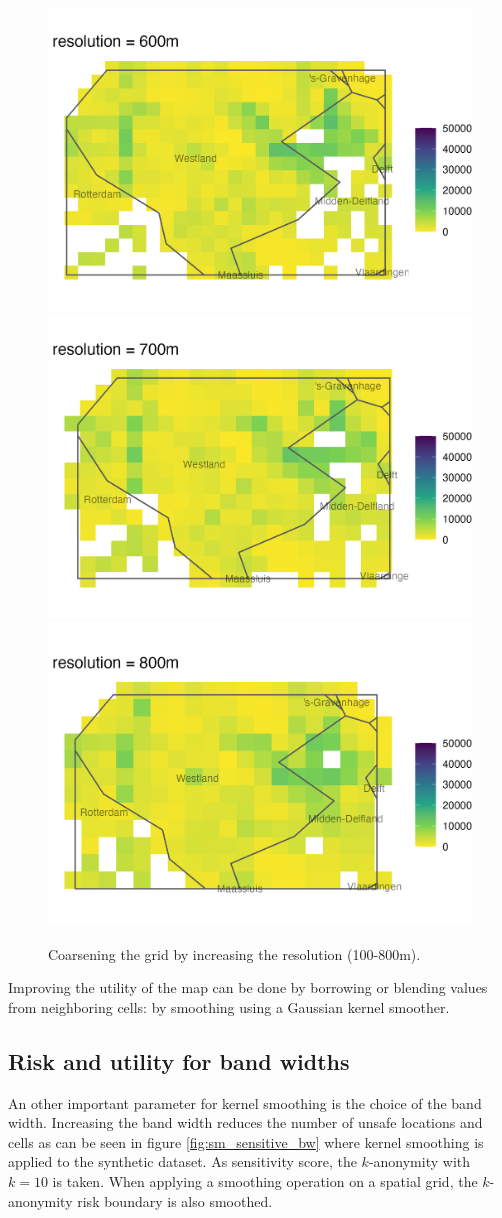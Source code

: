 \begin{figure}[H]
    \includegraphics[width=.49\linewidth]{figures/Smoothing/res_600.png}\\
    \includegraphics[width=.49\linewidth]{figures/Smoothing/res_700.png}
    \includegraphics[width=.49\linewidth]{figures/Smoothing/res_800.png}\\
    \caption{Coarsening the grid by increasing the resolution (100-800m).}
    \label{fig:sm_resolution}
\end{figure}

Improving the utility of the map can be done by borrowing or blending values from 
neighboring cells: by smoothing using a Gaussian kernel smoother. 

\subsection{Risk and utility for band widths}

An other important parameter for kernel smoothing is the choice of the band width.
Increasing the band width reduces the number of unsafe locations and cells as
can be seen in figure \ref{fig:sm_sensitive_bw} where kernel smoothing is 
applied to the synthetic dataset. As sensitivity score, the $k$-anonymity with $k = 10$ is taken. When applying a smoothing operation on a spatial grid, the $k$-anonymity risk boundary is also smoothed.

